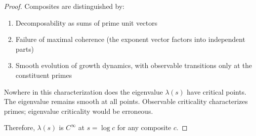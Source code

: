 \begin{proof}
Composites are distinguished by:
\begin{enumerate}
\item Decomposability as sums of prime unit vectors
\item Failure of maximal coherence (the exponent vector factors into independent parts)
\item Smooth evolution of growth dynamics, with observable transitions only at the constituent primes
\end{enumerate}

Nowhere in this characterization does the eigenvalue $\lambda(s)$ have critical points. The eigenvalue remains smooth at all points. Observable criticality characterizes primes; eigenvalue criticality would be erroneous.

Therefore, $\lambda(s)$ is $C^\infty$ at $s = \log c$ for any composite $c$.

\end{proof}

